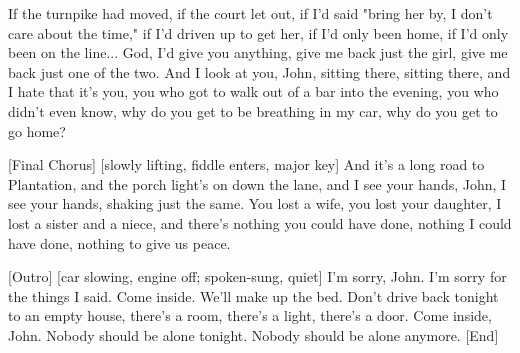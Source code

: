 \begin{lyrics}
If the turnpike had moved, if the court let out,
if I'd said "bring her by, I don't care about the time,"
if I'd driven up to get her, if I'd only been home,
if I'd only been on the line...
God, I'd give you anything, give me back just the girl,
give me back just one of the two.
And I look at you, John, sitting there, sitting there,
and I hate that it's you,
you who got to walk out of a bar into the evening,
you who didn't even know,
why do you get to be breathing in my car,
why do you get to go home?

[Final Chorus]
[slowly lifting, fiddle enters, major key]
And it's a long road to Plantation,
and the porch light's on down the lane,
and I see your hands, John, I see your hands,
shaking just the same.
You lost a wife, you lost your daughter,
I lost a sister and a niece,
and there's nothing you could have done, nothing I could have done,
nothing to give us peace.

[Outro]
[car slowing, engine off; spoken-sung, quiet]
I'm sorry, John. I'm sorry for the things I said.
Come inside. We'll make up the bed.
Don't drive back tonight to an empty house,
there's a room, there's a light, there's a door.
Come inside, John.
Nobody should be alone tonight.
Nobody should be alone anymore.
[End]
\end{lyrics}

